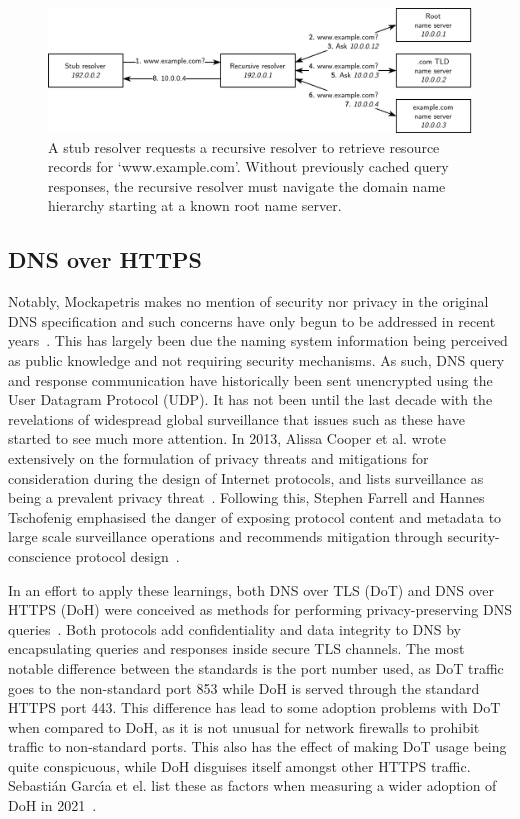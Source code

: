 \begin{figure}[ht]
\centerline{\includegraphics[width=160mm]{images/dns-resolve.png}}
\caption[Example DNS name resolution process]{A stub resolver requests a recursive resolver to retrieve resource records for `www.example.com'. Without previously cached query responses, the recursive resolver must navigate the domain name hierarchy starting at a known root name server.}
\label{dns_resolve_figure}
\end{figure}

\subsection{DNS over HTTPS}

Notably, Mockapetris makes no mention of security nor privacy in the original DNS specification and such concerns have only begun to be addressed in recent years~\cite{rfc7626}. This has largely been due the naming system information being perceived as public knowledge and not requiring security mechanisms. As such, DNS query and response communication have historically been sent unencrypted using the User Datagram Protocol (UDP). It has not been until the last decade with the revelations of widespread global surveillance that issues such as these have started to see much more attention. In 2013, Alissa Cooper et al. wrote extensively on the formulation of privacy threats and mitigations for consideration during the design of Internet protocols, and lists surveillance as being a prevalent privacy threat~\cite{rfc6973}. Following this, Stephen Farrell and Hannes Tschofenig emphasised the danger of exposing protocol content and metadata to large scale surveillance operations and recommends mitigation through security-conscience protocol design~\cite{rfc7258}.

In an effort to apply these learnings, both DNS over TLS (DoT) and DNS over HTTPS (DoH) were conceived as methods for performing privacy-preserving DNS queries~\cite{rfc7858, rfc8484}. Both protocols add confidentiality and data integrity to DNS by encapsulating queries and responses inside secure TLS channels. The most notable difference between the standards is the port number used, as DoT traffic goes to the non-standard port 853 while DoH is served through the standard HTTPS port 443. This difference has lead to some adoption problems with DoT when compared to DoH, as it is not unusual for network firewalls to prohibit traffic to non-standard ports. This also has the effect of making DoT usage being quite conspicuous, while DoH disguises itself amongst other HTTPS traffic. Sebasti{\'a}n Garc{\'\i}a et el. list these as factors when measuring a wider adoption of DoH in 2021~\cite{garcia2021large}.

